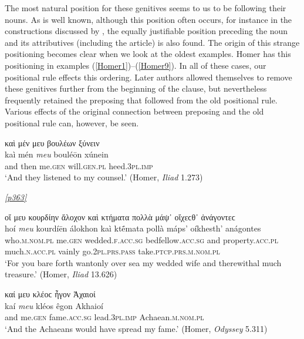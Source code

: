 The most natural position for these genitives seems to us to be following their nouns. As is well known, although this position often occurs, for instance in the  constructions discussed by \citet{Wilamowitz1889}, the equally justifiable position preceding the noun and its attributives (including the article) is also found. The origin of this strange positioning becomes clear when we look at the oldest examples. Homer has this positioning in examples (\ref{Homer1})--(\ref{Homer9}). In all of these cases, our positional rule effects this ordering. Later authors allowed themselves to remove these genitives further from the beginning of the clause, but nevertheless frequently retained the preposing that followed from the old positional rule. Various effects of the original connection between preposing and the old positional rule can, however, be seen.

\begin{exe}
\ex καὶ μέν μευ βουλέων ξύνειν\\
\gll kaì mén \emph{meu} bouléōn xúnein\\
and then me.\textsc{gen} will.\textsc{gen.pl} heed.\textsc{3pl.imp}\\
\trans `And they listened to my counsel.' (Homer, \textit{Iliad} 1.273)
\label{Homer1}
\end{exe}

\hyperlink{p363}{\emph{[p363]}}

\begin{exe}
\ex οἵ μευ κουρδίην ἄλοχον καὶ κτήματα πολλὰ μάψ᾽ οἴχεϲθ᾽ ἀνάγοντεϲ\\
\gll hoí \emph{meu} kourdíēn álokhon kaì ktḗmata pollà máps' oíkhesth' anágontes\\
who.\textsc{m.nom.pl} me.\textsc{gen} wedded.\textsc{f.acc.sg} bedfellow.\textsc{acc.sg} and property.\textsc{acc.pl} much.\textsc{n.acc.pl} vainly go.\textsc{2pl.prs.pass} take.\textsc{ptcp.prs.m.nom.pl}\\
\trans `For you bare forth wantonly over sea my wedded wife and therewithal much treasure.' (Homer, \textit{Iliad} 13.626)
\label{Homer2}
\end{exe}

\begin{exe}
\ex καί μευ κλέοϲ ἦγον Ἀχαιοί\\
\gll kaí \emph{meu} kléos êgon Akhaioí\\
and me.\textsc{gen} fame.\textsc{acc.sg} lead.\textsc{3pl.imp} Achaean.\textsc{m.nom.pl}\\
\trans `And the Achaeans would have spread my fame.' (Homer, \textit{Odyssey} 5.311)
\label{Homer3}
\end{exe}

